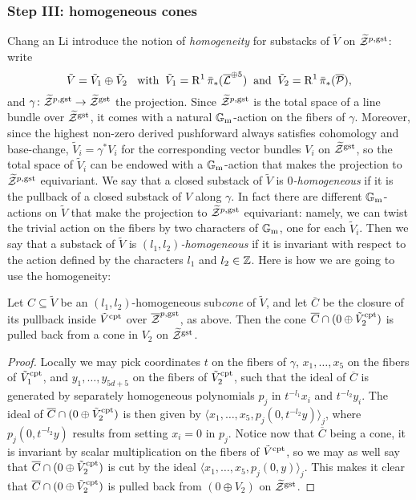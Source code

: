  \subsubsection{Step III: homogeneous cones}
Chang an Li introduce the notion of \emph{homogeneity} for substacks of $\tilde V$ on $\widetilde{\mathcal Z}^{p,\rm{gst}}$: write 
\[\tilde V=\tilde V_1\oplus\tilde V_2\;\;\text{ with} \;\;\tilde V_1=\operatorname{R}^1\bar{\pi}_*(\overline{\mathcal{L}}^{\oplus 5})\;\; \text{and}\;\; \tilde V_2=\operatorname{R}^1\bar{\pi}_*(\overline{\mathcal P}),\]
 and $\gamma\colon \widetilde{\mathcal Z}^{p,\rm{gst}}\rightarrow\widetilde{\mathcal Z}^{\rm{gst}}$ the projection. Since $\widetilde{\mathcal Z}^{p,\rm{gst}}$ is the total space of a line bundle over $\widetilde{\mathcal Z}^{\rm{gst}}$, it comes with a natural $\mathbb{G}_{\text{m}}$-action on the fibers of $\gamma$. Moreover, since the highest non-zero derived pushforward always satisfies cohomology and base-change, $\tilde V_i=\gamma^*V_i$ for the corresponding vector bundles $V_i$ on $\widetilde{\mathcal Z}^{\rm{gst}}$, so the total space of $\tilde V_i$ can be endowed with a $\mathbb{G}_{\text{m}}$-action that makes the projection to $\widetilde{\mathcal Z}^{p,\rm{gst}}$ equivariant. We say that a closed substack of $\tilde V$ is $0$\emph{-homogeneous} if it is the pullback of a closed substack of $V$ along $\gamma$. In fact there are different $\mathbb{G}_{\text{m}}$-actions on $\tilde V$ that make the projection to $\widetilde{\mathcal Z}^{p,\rm{gst}}$ equivariant: namely, we can twist the trivial action on the fibers by two characters of $\mathbb{G}_{\text{m}}$, one for each $\tilde V_i$. Then we say that a substack of $\tilde V$ is $(l_1,l_2)$\emph{-homogeneous} if it is invariant with respect to the action defined by the characters $l_1$ and $l_2\in\mathbb{Z}$. Here is how we are going to use the homogeneity:

\begin{lem}
 Let $C\subseteq \tilde V$ be an $(l_1,l_2)$-homogeneous sub\emph{cone} of $\tilde V$, and let $\overline{C}$ be the closure of its pullback inside $\tilde V^{\rm{cpt}}$ over $\overline{\mathcal Z}^{p,\rm{gst}}$, as above. Then the cone $\overline{C}\cap(0\oplus\tilde V_2^{\rm{cpt}})$ is pulled back from a cone in $V_2$ on $\widetilde{\mathcal Z}^{\rm{gst}}$.
\end{lem}
\begin{proof}
 Locally we may pick coordinates $t$ on the fibers of $\gamma$, $x_1,\ldots,x_5$ on the fibers of $\tilde V_1^{\rm{cpt}}$, and $y_1,\ldots,y_{5d+5}$ on the fibers of $\tilde V_2^{\rm{cpt}}$, such that the ideal of $\overline{C}$ is generated by separately homogeneous polynomials $p_j$ in $t^{-l_1}x_i$ and $t^{-l_2}y_i$. The ideal of $\overline{C}\cap(0\oplus\tilde V_2^{\rm{cpt}})$ is then given by $\langle x_1,\ldots, x_5,p_j(0,t^{-l_2}y)\rangle_j$, where $p_j(0,t^{-l_2}y)$ results from setting $x_i=0$ in $p_j$. Notice now that $\overline{C}$ being a cone, it is invariant by scalar multiplication on the fibers of $\tilde V^{\rm{cpt}}$, so we may as well say that $\overline{C}\cap(0\oplus\tilde V_2^{\rm{cpt}})$ is cut by the ideal $\langle x_1,\ldots, x_5,p_j(0,y)\rangle_j$. This makes it clear that $\overline{C}\cap(0\oplus\tilde V_2^{\rm{cpt}})$ is pulled back from $(0\oplus V_2)$ on $\widetilde{\mathcal Z}^{\rm{gst}}$.
\end{proof}

